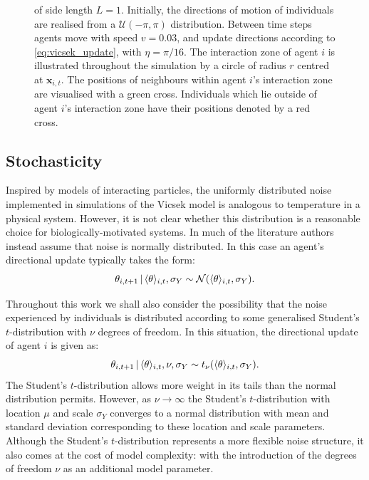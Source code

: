 \begin{figure}[tb]
{      of side length $L=1$. Initially, the directions of motion of
      individuals are realised from a $\mathcal{U}(-\pi, \pi)$ distribution.
      Between time steps agents move with speed $v=0.03$, and update
      directions according to \cref{eq:vicsek_update}, with $\eta=\pi/16$.
      The interaction zone of agent $i$ is illustrated throughout the
      simulation by a circle of radius $r$ centred at $\bm{x}_{i,t}$. The
      positions of neighbours within agent $i$'s interaction zone are
      visualised with a green cross. Individuals which lie outside of agent
      $i$'s interaction zone have their positions denoted by a red cross.}
    \label{fig:vicsek_illustration}
\end{figure}

\subsection{Stochasticity}

Inspired by models of interacting particles, the uniformly distributed noise
implemented in simulations of the Vicsek model is analogous to temperature in a
physical system. However, it is not clear whether this distribution is a
reasonable choice for biologically-motivated systems. In much of the literature
authors instead assume that noise is normally distributed. In this case an
agent's directional update typically takes the form:
\begin{equation*}
    \theta_{i,t+1} \,|\, \langle\theta\rangle_{i,t}, \sigma_Y \sim
        \mathcal{N}(\langle\theta\rangle_{i,t}, \sigma_Y).
\end{equation*}

Throughout this work we shall also consider the possibility that the noise
experienced by individuals is distributed according to some generalised
Student's $t$-distribution with $\nu$ degrees of freedom. In this situation,
the directional update of agent $i$ is given as:
\begin{equation}
    \label{eq:students_update}
    \theta_{i,t+1} \,|\, \langle\theta\rangle_{i,t}, \nu, \sigma_Y \sim
    t_{\nu}(\langle\theta\rangle_{i,t}, \sigma_Y).
\end{equation}
The Student's $t$-distribution allows more weight in its tails than the normal
distribution permits. However, as $\nu\rightarrow\infty$ the Student's
$t$-distribution with location $\mu$ and scale $\sigma_Y$ converges to a normal
distribution with mean and standard deviation corresponding to these location
and scale parameters. Although the Student's $t$-distribution represents a
more flexible noise structure, it also comes at the cost of model complexity:
with the introduction of the degrees of freedom $\nu$ as an additional model
parameter.

